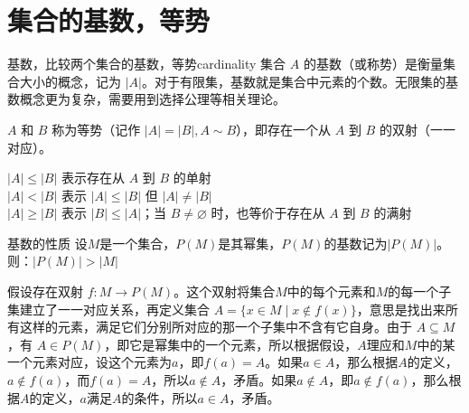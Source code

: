 \section{集合的基数，等势}
\begin{definition}{基数，比较两个集合的基数，等势}{cardinality}
集合 $A$ 的基数（或称势）是衡量集合大小的概念，记为 $|A|$。对于有限集，基数就是集合中元素的个数。无限集的基数概念更为复杂，需要用到选择公理等相关理论。

$A$ 和 $B$ 称为等势（记作 $|A| = |B|,A\sim B$），即存在一个从 $A$ 到 $B$ 的双射（一一对应）。

$|A| \leqslant |B|$ 表示存在从 $A$ 到 $B$ 的单射\\
$|A| < |B|$ 表示 $|A| \leqslant |B|$ 但 $|A| \neq |B|$\\
$|A| \geqslant |B|$ 表示 $|B| \leqslant |A|$；当 $B\ne\varnothing$ 时，也等价于存在从 $A$ 到 $B$ 的满射
\end{definition}
\begin{theorem}{基数的性质}{}
设$M$是一个集合，$P(M)$是其幂集，$P(M)$的基数记为$|P(M)|$。则：$|P(M)|>|M|$
\end{theorem}
假设存在双射 $f: M \to P(M)$。这个双射将集合$M$中的每个元素和$M$的每一个子集建立了一一对应关系，再定义集合 $A = \{ x \in M \mid x \notin f(x) \}$，意思是找出来所有这样的元素，满足它们分别所对应的那一个子集中不含有它自身。由于 $A \subseteq M$，有 $A \in P(M)$，即它是幂集中的一个元素，所以根据假设，$A$理应和$M$中的某一个元素对应，设这个元素为$a$，即$f(a) = A$。如果$a \in A$，那么根据$A$的定义，$a \notin f(a)$，而$f(a) = A$，所以$a \notin A$，矛盾。如果$a \notin A$，即$a \notin f(a)$，那么根据$A$的定义，$a$满足$A$的条件，所以$a \in A$，矛盾。

